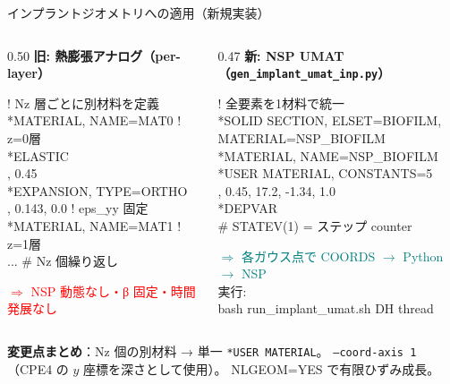 \documentclass[
  ignorenonframetext,
  aspectratio=169,
]{beamer}
\begin{document}
\begin{frame}[fragile]{インプラントジオメトリへの適用（新規実装）}
\protect\hypertarget{code-implant-umat}{}

\begin{columns}[T]
\begin{column}{0.50\textwidth}
\textbf{旧: 熱膨張アナログ（per-layer）}\\[2pt]
{\footnotesize\ttfamily
\begin{tabbing}
! Nz 層ごとに別材料を定義\\
*MATERIAL, NAME=MAT0   ! z=0層\\
*ELASTIC\\
, 0.45\\
*EXPANSION, TYPE=ORTHO\\
, 0.143, 0.0  ! eps\_yy 固定\\
*MATERIAL, NAME=MAT1   ! z=1層\\
...   \# Nz 個繰り返し
\end{tabbing}
}
\textcolor{red}{\small $\Rightarrow$ NSP 動態なし・β 固定・時間発展なし}
\end{column}
\begin{column}{0.47\textwidth}
\textbf{新: NSP UMAT（\texttt{gen\_implant\_umat\_inp.py}）}\\[2pt]
{\footnotesize\ttfamily
\begin{tabbing}
! 全要素を1材料で統一\\
*SOLID SECTION, ELSET=BIOFILM,\\
\quad MATERIAL=NSP\_BIOFILM\\
*MATERIAL, NAME=NSP\_BIOFILM\\
*USER MATERIAL, CONSTANTS=5\\
, 0.45, 17.2, -1.34, 1.0\\
*DEPVAR\\
   \# STATEV(1) = ステップ counter
\end{tabbing}
}
\textcolor{teal}{\small $\Rightarrow$ 各ガウス点で COORDS $\to$ Python $\to$ NSP}\\[4pt]
{\footnotesize 実行:}\\
{\footnotesize\ttfamily bash run\_implant\_umat.sh DH thread}
\end{column}
\end{columns}

\vspace{6pt}
\textbf{変更点まとめ}：Nz 個の別材料 → 単一 \texttt{*USER MATERIAL}。
\texttt{--coord-axis 1}（CPE4 の $y$ 座標を深さとして使用）。
NLGEOM=YES で有限ひずみ成長。
\end{frame}
\end{document}
